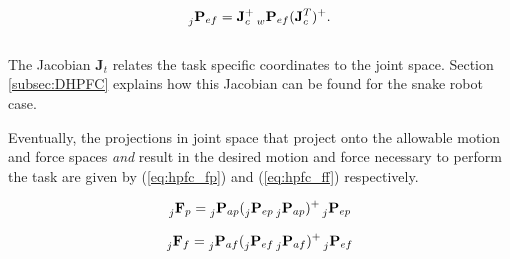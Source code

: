 \begin{equation}\label{eq:hpfc_jeF}
    \prescript{}{j}{\mathbf{P}}_{ef} = \mathbf{J}_c^+ \prescript{}{w}{\mathbf{P}}_{ef} (\mathbf{J}_c^T)^+.
\end{equation}
\\
The Jacobian $\mathbf{J}_t$ relates the task specific coordinates to the joint space. Section \ref{subsec:DHPFC} explains how this Jacobian can be found for the snake robot case.

Eventually, the projections in joint space that project onto the allowable motion and force spaces \textit{and} result in the desired motion and force necessary to perform the task are given by (\ref{eq:hpfc_fp}) and (\ref{eq:hpfc_ff}) respectively.

\begin{equation}\label{eq:hpfc_fp}
    \prescript{}{j}{\mathbf{F}}_{p} = \prescript{}{j}{\mathbf{P}}_{ap} (\prescript{}{j}{\mathbf{P}}_{ep} \prescript{}{j}{\mathbf{P}}_{ap})^+ \prescript{}{j}{\mathbf{P}}_{ep}
\end{equation}

\begin{equation}\label{eq:hpfc_ff}
    \prescript{}{j}{\mathbf{F}}_{f} = \prescript{}{j}{\mathbf{P}}_{af} (\prescript{}{j}{\mathbf{P}}_{ef} \prescript{}{j}{\mathbf{P}}_{af})^+ \prescript{}{j}{\mathbf{P}}_{ef}
\end{equation}